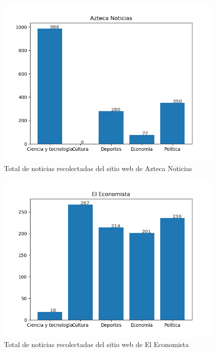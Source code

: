 \begin{figure}[H]
	\centering
	\includegraphics[scale=.45]{imagenes/Capitulo5/azteca.png}
	\caption{Total de noticias recolectadas del sitio web de Azteca Noticias}
	\label{Fig:notsitioazteca}
\end{figure}

\begin{figure}[H]
	\centering
	\includegraphics[scale=.45]{imagenes/Capitulo5/economista.png}
	\caption{Total de noticias recolectadas del sitio web de El Economista}
	\label{Fig:notsitioeconomista}
\end{figure}

